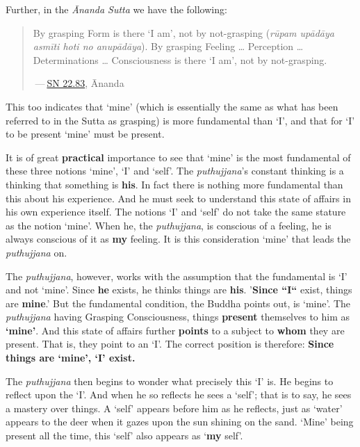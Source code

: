 Further, in the \emph{Ānanda Sutta} we have the following:

\begin{quote}
By grasping Form is there `I am', not by not-grasping (\emph{rūpam upādāya asmīti hoti no anupādāya}). By grasping Feeling \ldots{} Perception \ldots{} Determinations \ldots{} Consciousness is there `I am', not by not-grasping.

 --- \href{https://suttacentral.net/sn22.83/en/bodhi}{SN 22.83}, Ānanda
\end{quote}

This too indicates that `mine' (which is essentially the same as what has been referred to in the Sutta as grasping) is more fundamental than `I', and that for `I' to be present `mine' must be present.

It is of great \textbf{practical} importance to see that `mine' is the most fundamental of these three notions `mine', `I' and `self'. The \emph{puthujjana}'s constant thinking is a thinking that something is \textbf{his}. In fact there is nothing more fundamental than this about his experience. And he must seek to understand this state of affairs in his own experience itself. The notions `I' and `self' do not take the same stature as the notion `mine'. When he, the \emph{puthujjana}, is conscious of a feeling, he is always conscious of it as \textbf{my} feeling. It is this consideration `mine' that leads the \emph{puthujjana} on.

The \emph{puthujjana}, however, works with the assumption that the fundamental is `I' and not `mine'. Since \textbf{he} exists, he thinks things are \textbf{his}. '\textbf{Since ``I``} exist, things are \textbf{mine}.' But the fundamental condition, the Buddha points out, is `mine'. The \emph{puthujjana} having Grasping Consciousness, things \textbf{present} themselves to him as \textbf{`mine'}. And this state of affairs further \textbf{points} to a subject to \textbf{whom} they are present. That is, they point to an `I'. The correct position is therefore: \textbf{Since things are `mine', `I' exist.}

The \emph{puthujjana} then begins to wonder what precisely this `I' is. He begins to reflect upon the `I'. And when he so reflects he sees a `self'; that is to say, he sees a mastery over things. A `self' appears before him as he reflects, just as `water' appears to the deer when it gazes upon the sun shining on the sand. `Mine' being present all the time, this `self' also appears as `\textbf{my} self'.

